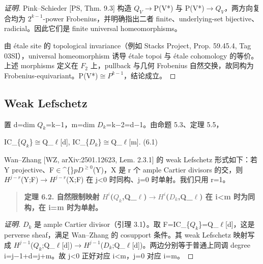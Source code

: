 \documentclass[11pt]{ctexart}
\begin{document}
\begin{proof}[证明] 

Pink–Schieder [PS, Thm. 9.3] 构造 \ensuremath{Q_{V}}\ensuremath{\to}P(V*) 与 P(V*)\ensuremath{\to}\ensuremath{Q_{V}}，两方向复合均为 \ensuremath{2^{k−1}}-power Frobenius，并明确指出二者 finite、underlying-set bijective、radicial。因此它们是 finite universal homeomorphisms。

由 étale site 的 topological invariance（例如 Stacks Project, Prop. 59.45.4, Tag 03SI），universal homeomorphism 诱导 étale topoi 与 étale cohomology 的等价。上述 morphisms 定义在 \ensuremath{F_2} 上，pullback 与几何 Frobenius 自然交换，故同构为 Frobenius-equivariant。P(V*)\ensuremath{\cong}\ensuremath{P^{k−1}}，结论成立。

\end{proof}

\subsection{Weak Lefschetz}

置 d=dim \ensuremath{Q_{k}}=k−1，m=dim \ensuremath{D_{k}}=k−2=d−1。由命题 5.3、定理 5.5，

IC\_\{\ensuremath{Q_{k}}\}\ensuremath{\cong}Q\_\ensuremath{\ell}[d],    IC\_\{\ensuremath{D_{k}}\}\ensuremath{\cong}Q\_\ensuremath{\ell}[m].    (6.1)

Wan–Zhang [WZ, arXiv:2501.12623, Lem. 2.3.1] 的 weak Lefschetz 形式如下：若 Y projective、F\ensuremath{\in}\textasciicircum\{\}\ensuremath{pD^{\ge0}}(Y)，X 是 r 个 ample Cartier divisors 的交，则 \ensuremath{H^{j−r}}(Y;F)\ensuremath{\to}\ensuremath{H^{j−r}}(X;F) 在 j<0 时同构、j=0 时单射。我们只用 r=1。

\begin{quote}\textbf{定理 6.2. 自然限制映射 \ensuremath{H^{i}}(\ensuremath{Q_{k}},Q\_\ensuremath{\ell})\ensuremath{\to}\ensuremath{H^{i}}(\ensuremath{D_{k}},Q\_\ensuremath{\ell}) 在 i<m 时为同构，在 i=m 时为单射。}\end{quote}

\begin{proof}[证明] 

\ensuremath{D_{k}} 是 ample Cartier divisor（引理 3.1）。取 F=IC\_\{\ensuremath{Q_{k}}\}=Q\_\ensuremath{\ell}[d]，这是 perverse sheaf，满足 Wan–Zhang 的 cosupport 条件。其 weak Lefschetz 映射写成 \ensuremath{H^{j−1}}(\ensuremath{Q_{k}};Q\_\ensuremath{\ell}[d])\ensuremath{\to}\ensuremath{H^{j−1}}(\ensuremath{D_{k}};Q\_\ensuremath{\ell}[d])。两边分别等于普通上同调 degree i=j−1+d=j+m。故 j<0 正好对应 i<m，j=0 对应 i=m。

\end{proof}
\end{document}
